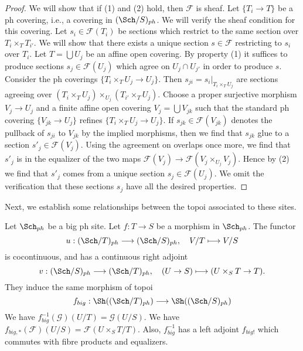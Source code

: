 \begin{proof}
We will show that if (1) and (2) hold, then $\mathcal{F}$ is sheaf.
Let $\{T_i \to T\}$ be a ph covering, i.e., a covering in $(\Sch/S)_{ph}$.
We will verify the sheaf condition for this covering.
Let $s_i \in \mathcal{F}(T_i)$ be sections which restrict to the same
section over $T_i \times_T T_{i'}$. We will show that there exists a
unique section $s \in \mathcal{F}$ restricting to $s_i$ over $T_i$.
Let $T = \bigcup U_j$ be an affine open covering.
By property (1) it suffices to produce sections $s_j \in \mathcal{F}(U_j)$
which agree on $U_j \cap U_{j'}$ in order to produce $s$.
Consider the ph coverings $\{T_i \times_T U_j \to U_j\}$.
Then $s_{ji} = s_i|_{T_i \times_T U_j}$ are sections agreeing
over $(T_i \times_T U_j) \times_{U_j} (T_{i'} \times_T U_j)$.
Choose a proper surjective morphism $V_j \to U_j$ and a finite affine
open covering $V_j = \bigcup V_{jk}$ such that the standard ph covering
$\{V_{jk} \to U_j\}$ refines $\{T_i \times_T U_j \to U_j\}$.
If $s_{jk} \in \mathcal{F}(V_{jk})$
denotes the pullback of $s_{ji}$ to $V_{jk}$ by the
implied morphisms, then we find that $s_{jk}$ glue to a section
$s'_j \in \mathcal{F}(V_j)$. Using the agreement on overlaps
once more, we find that $s'_j$ is in the equalizer of the two
maps $\mathcal{F}(V_j) \to \mathcal{F}(V_j \times_{U_j} V_j)$.
Hence by (2) we find that $s'_j$ comes from a unique section
$s_j \in \mathcal{F}(U_j)$. We omit the verification that these
sections $s_j$ have all the desired properties.
\end{proof}

\noindent
Next, we establish some relationships between the topoi
associated to these sites.

\begin{lemma}
\label{lemma-morphism-big-ph}
Let $\Sch_{ph}$ be a big ph site.
Let $f : T \to S$ be a morphism in $\Sch_{ph}$.
The functor
$$
u : (\Sch/T)_{ph} \longrightarrow (\Sch/S)_{ph},
\quad
V/T \longmapsto V/S
$$
is cocontinuous, and has a continuous right adjoint
$$
v : (\Sch/S)_{ph} \longrightarrow (\Sch/T)_{ph},
\quad
(U \to S) \longmapsto (U \times_S T \to T).
$$
They induce the same morphism of topoi
$$
f_{big} :
\Sh((\Sch/T)_{ph})
\longrightarrow
\Sh((\Sch/S)_{ph})
$$
We have $f_{big}^{-1}(\mathcal{G})(U/T) = \mathcal{G}(U/S)$.
We have $f_{big, *}(\mathcal{F})(U/S) = \mathcal{F}(U \times_S T/T)$.
Also, $f_{big}^{-1}$ has a left adjoint $f_{big!}$ which commutes with
fibre products and equalizers.
\end{lemma}

